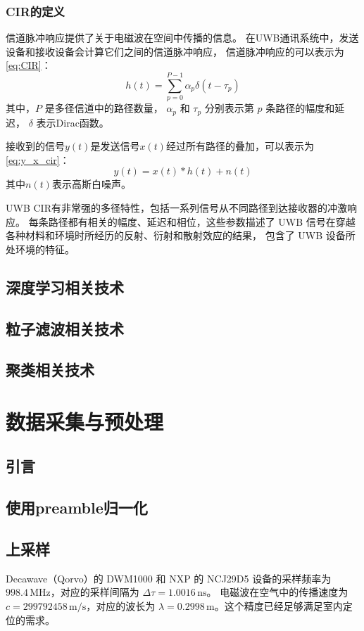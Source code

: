 \subsection{CIR的定义}
信道脉冲响应提供了关于电磁波在空间中传播的信息。
在UWB通讯系统中，发送设备和接收设备会计算它们之间的信道脉冲响应，
信道脉冲响应的可以表示为\ref{eq:CIR}：
\begin{equation}\label{eq:CIR}
    h(t)=\sum_{p=0}^{P-1} \alpha_p \delta\left(t-\tau_p\right)
\end{equation}
其中，\( P \) 是多径信道中的路径数量，
\( \alpha_p \) 和 \( \tau_p \) 分别表示第 \( p \) 条路径的幅度和延迟，
\(\delta\) 表示Dirac函数\cite{UWB_CIR_INTRO}。

接收到的信号\(y(t)\)是发送信号\(x(t)\)经过所有路径的叠加，可以表示为\ref{eq:y_x_cir}：
\begin{equation}\label{eq:y_x_cir}
    y(t)=x(t) * h(t)+n(t)
\end{equation}
其中\( n(t) \)表示高斯白噪声\cite{tse2005fundamentals}。 

UWB CIR有非常强的多径特性，包括一系列信号从不同路径到达接收器的冲激响应。
每条路径都有相关的幅度、延迟和相位，这些参数描述了
UWB 信号在穿越各种材料和环境时所经历的反射、衍射和散射效应的结果，
包含了 UWB 设备所处环境的特征。


\section{深度学习相关技术}

\section{粒子滤波相关技术}

\section{聚类相关技术}

\chapter{数据采集与预处理}
\section{引言}
\section{使用preamble归一化}
\section{上采样}
Decawave（Qorvo）的 DWM1000 和 NXP 的 NCJ29D5 设备的采样频率为 \(998.4 \, \text{MHz}\)，对应的采样间隔为 \( \Delta \tau = 1.0016 \, \text{ns}\)。
电磁波在空气中的传播速度为 \(c = 299792458 \, \text{m/s}\)，对应的波长为 \(\lambda = 0.2998 \, \text{m}\)。这个精度已经足够满足室内定位的需求。


